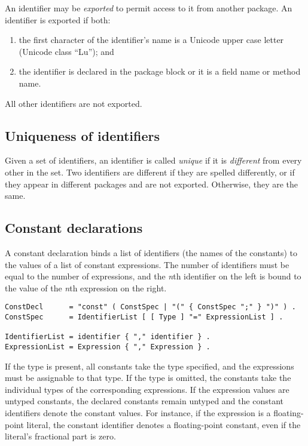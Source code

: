 An identifier may be \emph{exported} to permit access to it from another
package. An identifier is exported if both:

\begin{enumerate}
\item
  the first character of the identifier's name is a Unicode upper case
  letter (Unicode class ``Lu''); and
\item
  the identifier is declared in the package block or
  it is a field name or
  method name.
\end{enumerate}

All other identifiers are not exported.

\subsection*{Uniqueness of identifiers}

Given a set of identifiers, an identifier is called \emph{unique} if it
is \emph{different} from every other in the set. Two identifiers are
different if they are spelled differently, or if they appear in
different packages and are not
exported. Otherwise, they are the
same.

\subsection*{Constant declarations}

A constant declaration binds a list of identifiers (the names of the
constants) to the values of a list of
constant expressions. The number of
identifiers must be equal to the number of expressions, and the
\emph{n}th identifier on the left is bound to the value of the
\emph{n}th expression on the right.

\begin{Verbatim}[frame=single]
ConstDecl      = "const" ( ConstSpec | "(" { ConstSpec ";" } ")" ) .
ConstSpec      = IdentifierList [ [ Type ] "=" ExpressionList ] .

IdentifierList = identifier { "," identifier } .
ExpressionList = Expression { "," Expression } .
\end{Verbatim}

If the type is present, all constants take the type specified, and the
expressions must be assignable to that type.
If the type is omitted, the constants take the individual types of the
corresponding expressions. If the expression values are untyped
constants, the declared constants remain untyped
and the constant identifiers denote the constant values. For instance,
if the expression is a floating-point literal, the constant identifier
denotes a floating-point constant, even if the literal's fractional part
is zero.

